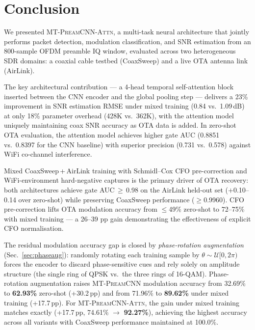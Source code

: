 \documentclass[conference]{IEEEtran}
\newcommand{\mtcnn}{\textsc{MT-PreamCNN}}
\newcommand{\mtcnnattn}{\textsc{MT-PreamCNN-Attn}}
\begin{document}
\section{Conclusion}
\label{sec:conclusion}

We presented \mtcnnattn{}, a multi-task neural architecture that
jointly performs packet detection, modulation classification, and
SNR estimation from an 800-sample OFDM preamble IQ window,
evaluated across two heterogeneous SDR domains: a coaxial cable
testbed (CoaxSweep) and a live OTA antenna link (AirLink).

The key architectural contribution — a 4-head temporal self-attention
block inserted between the CNN encoder and the global pooling step —
delivers a 23\% improvement in SNR estimation RMSE under mixed training
(0.84 vs.\ 1.09\,dB) at only 18\% parameter overhead (428K vs.\ 362K),
with the attention model uniquely maintaining coax SNR accuracy as OTA
data is added.
In zero-shot OTA evaluation, the attention model achieves higher gate
AUC (0.8851 vs.\ 0.8397 for the CNN baseline) with superior precision
(0.731 vs.\ 0.578) against WiFi co-channel interference.

Mixed CoaxSweep\,+\,AirLink training with Schmidl--Cox CFO
pre-correction and WiFi-environment hard-negative captures is the
primary driver of OTA recovery: both architectures achieve gate
AUC\,$\ge$\,0.98 on the AirLink held-out set ($+$0.10--0.14 over
zero-shot) while preserving CoaxSweep performance ($\ge$0.9960).
CFO pre-correction lifts OTA modulation accuracy from $\le$49\%
zero-shot to 72--75\% with mixed training — a 26--39 pp gain
demonstrating the effectiveness of explicit CFO normalisation.

The residual modulation accuracy gap is closed by \emph{phase-rotation
augmentation} (Sec.~\ref{sec:phaseaug}): randomly rotating each
training sample by $\theta \sim \mathcal{U}[0,2\pi)$ forces the encoder
to discard phase-sensitive cues and rely solely on amplitude structure
(the single ring of QPSK vs.\ the three rings of 16-QAM).
Phase-rotation augmentation raises \mtcnn{} modulation accuracy from
32.69\% to \textbf{62.93\%} zero-shot (+30.2\,pp) and from 71.96\%
to \textbf{89.62\%} under mixed training (+17.7\,pp).
For \mtcnnattn{}, the gain under mixed training matches exactly
(+17.7\,pp, 74.61\% $\to$ \textbf{92.27\%}), achieving the
highest accuracy across all variants with CoaxSweep performance
maintained at 100.0\%.
\end{document}
